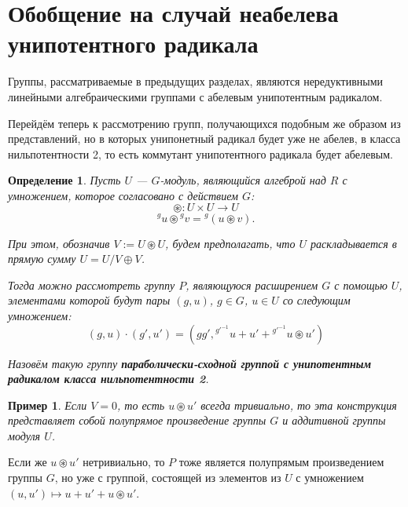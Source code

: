 \documentclass[12pt]{matmex-diploma}
\theoremstyle{mystyleni}
\theoremstyle{mystyle}
\newtheorem{example}{Пример}
\newtheorem{definition}{Определение}
\newenvironment{framed}
    {
\vspace{1.5ex}
\begin{tcolorbox}[colback=white, grow to left by=1.2em, grow to right by=1.2em, enhanced]
    }
    {
\end{tcolorbox}
    }
\begin{document}
\pagebreak
\section{Обобщение на случай неабелева унипотентного радикала}

Группы, рассматриваемые в предыдущих разделах, являются нередуктивными линейными алгебраическими группами с абелевым унипотентным радикалом.

Перейдём теперь к рассмотрению групп, получающихся подобным же образом из представлений, но в которых унипонетный радикал будет уже не абелев, в класса нильпотентности 2, то есть коммутант унипотентного радикала будет абелевым.

\begin{framed}
\begin{definition}
Пусть $U$ --- $G$-модуль, являющийся алгеброй над $R$ с умножением, которое согласовано с действием $G$:
$$\circledast : U \times U \to U$$
$$ {}^g u \circledast {}^g v = {}^g (u \circledast v) .$$

При этом, обозначив $V:=U\circledast U$, будем предполагать, что $U$ раскладывается в прямую сумму $U = U/V \oplus V$.

Тогда можно рассмотреть группу $P$, являющуюся расширением $G$ с помощью $U$, элементами которой будут пары $(g,u)$, $g \in G$, $u \in U$ со следующим умножением:
$$
(g,u)\cdot (g',u') = (g g', {}^{g'^{-1}} u + u' + {}^{g'^{-1}} u \circledast u')
$$

Назовём такую группу \textit{\textbf{параболически-сходной группой с унипотентным радикалом класса нильпотентности 2}}.
\end{definition}
\end{framed}

\begin{example}
Если $V=0$, то есть $u \circledast u'$ всегда тривиально, то эта конструкция представляет собой полупрямое произведение группы $G$ и аддитивной группы модуля $U$.
\end{example}

Если же $u \circledast u'$ нетривиально, то $P$ тоже является полупрямым произведением группы $G$, но уже с группой, состоящей из элементов из $U$ с умножением
$
(u,u') \mapsto u + u' + u \circledast u'
$.
\end{document}
